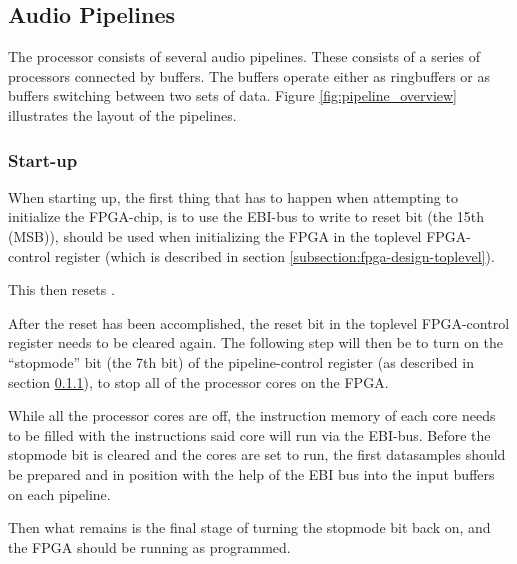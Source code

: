 \FloatBarrier
\subsection{Audio Pipelines}\label{sec:audio_pipelines}


The processor consists of several audio pipelines. These consists of
a series of processors connected by buffers. The buffers operate either
as ringbuffers or as buffers switching between two sets of data.
Figure \ref{fig:pipeline_overview} illustrates the
layout of the pipelines.

\subsubsection{Start-up}\label{subsection:fpga-pipeline-startup}


When starting up, the first thing that has to happen when attempting to
initialize the FPGA-chip, is to use the EBI-bus to write to reset bit (the 15th
(MSB)), should be used when initializing the FPGA in the toplevel
FPGA-control register (which is described in section
\ref{subsection:fpga-design-toplevel}).

This then resets .

After the reset has been accomplished, the reset bit in the toplevel
FPGA-control register needs to be cleared again. The following step will then be
to turn on the ``stopmode'' bit (the 7th bit) of the pipeline-control
register (as described in section \ref{subsection:fpga-pipeline-startup}),
to stop all of the processor cores on the FPGA.

While all the processor cores are off, the instruction memory of each core needs
to be filled with the instructions said core will run via the EBI-bus. Before
the stopmode bit is cleared and the cores are set to run, the first datasamples
should be prepared and in position with the help of the EBI bus into the input
buffers on each pipeline.

Then what remains is the final stage of turning the stopmode bit back on, and
the FPGA should be running as programmed.

